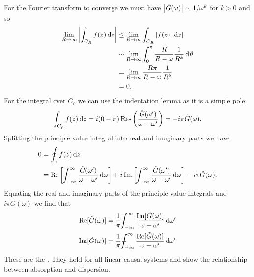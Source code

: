 \documentclass{article}
\newcommand{\pvint}{{-\mkern-19mu}\int}
\begin{document}
    For the Fourier transform to converge we must have \(\abs{\tilde{G}(\omega)} \sim 1/\omega^{k}\) for \(k > 0\) and so
    \begin{align*}
        \lim_{R\to\infty} \abs{\int_{C_R} f(z) \dd{z}} &\le \lim_{R\to\infty} \int_{C_R} \abs{f(z)} \abs{\dd{z}}\\
        &\sim \lim_{R\to\infty} \int_{0}^{\pi}  \frac{R}{R - \omega} \frac{1}{R^k} \dd{\vartheta}\\
        &= \lim_{R\to\infty} \frac{R\pi}{R - \omega}\frac{1}{R^k}\\
        &= 0.
    \end{align*}
    For the integral over \(C_\rho\) we can use the indentation lemma as it is a simple pole:
    \[\int_{C_\rho} f(z) \dd{z} = i(0 - \pi)\Res\left( \frac{\tilde{G}(\omega')}{\omega - \omega'} \right) = -i\pi\tilde{G}(\omega).\]
    Splitting the principle value integral into real and imaginary parts we have
    \begin{align*}
        0 &= \oint_{\gamma} f(z) \dd{z}\\
        &= \Re\left[ \pvint_{-\infty}^{\infty} \frac{\tilde{G}(\omega')}{\omega - \omega'} \dd{\omega} \right] + i\Im\left[ \pvint_{-\infty}^{\infty} \frac{\tilde{G}(\omega')}{\omega - \omega'} \dd{\omega} \right] - i\pi\tilde{G}(\omega).
    \end{align*}
    Equating the real and imaginary parts of the principle value integrals and \(i\pi\tilde{G}(\omega)\) we find that
    \begin{align*}
        \Re[\tilde{G}(\omega)] &= \frac{1}{\pi} \pvint_{-\infty}^{\infty} \frac{\Im[\tilde{G}(\omega)]}{\omega - \omega'} \dd{\omega'}\\
        \Im[\tilde{G}(\omega)] &= \frac{1}{\pi} \pvint_{-\infty}^{\infty} \frac{\Re[\tilde{G}(\omega)]}{\omega - \omega'} \dd{\omega'}\\
    \end{align*}
    These are the .
    They hold for all linear causal systems and show the relationship between absorption and dispersion.
    
\end{document}
